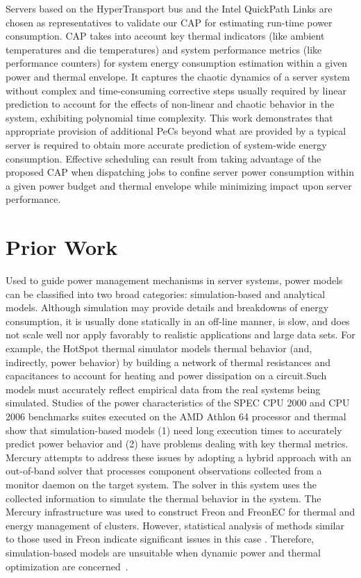 \documentclass[acmtaco]{acmtrans2m}
\begin{document}
Servers based on the HyperTransport bus \cite{HT2008} and the Intel
QuickPath Links \cite{Intel2009} are chosen as representatives to validate
our CAP for estimating run-time power consumption.  CAP takes into
account key thermal indicators (like ambient temperatures and die
temperatures) and system performance metrics (like performance counters)
for system energy consumption estimation within a given power and
thermal envelope. It captures the chaotic dynamics of a server system
without complex and time-consuming corrective steps usually required by
linear prediction to account for the effects of non-linear and chaotic
behavior in the system, exhibiting polynomial time complexity.  This
work demonstrates that appropriate provision of additional PeCs beyond
what are provided by a typical server is required to obtain more
accurate prediction of system-wide energy consumption.  Effective
scheduling can result from taking advantage of the proposed CAP when
dispatching jobs to confine server power consumption within a given
power budget and thermal envelope while minimizing impact upon server
performance.

\section{Prior Work}
\label{sec:priorwork}
Used to guide power management mechanisms in server systems, power
models can be classified into two broad categories: simulation-based and
analytical models. Although simulation may provide details and
breakdowns of energy consumption, it is usually done statically in an
off-line manner, is slow, and does not scale well nor apply favorably to
realistic applications and large data sets. For example, the HotSpot
thermal simulator \cite{Skadron2004} models thermal behavior (and,
indirectly, power behavior) by building a network of thermal resistances
and capacitances to account for heating and power dissipation on a
circuit.Such models must accurately reflect empirical data from the real
systems being simulated. Studies of the power characteristics of the
SPEC CPU 2000 and CPU 2006 benchmarks suites executed on the AMD Athlon
64 processor \cite{MesaMartinez2007} and thermal \cite{MesaMartinez2010}
show that simulation-based models (1) need long execution times to
accurately predict power behavior and (2) have problems dealing with key
thermal metrics.  Mercury \cite{Heath2006} attempts to address these
issues by adopting a hybrid approach with an out-of-band solver that
processes component observations collected from a monitor daemon on the
target system.  The solver in this system uses the collected information
to simulate the thermal behavior in the system.  The Mercury
infrastructure was used to construct Freon and FreonEC for thermal and
energy management of clusters. However, statistical analysis of methods
similar to those used in Freon indicate significant issues in this case
\cite{DavisRivoire2011}. Therefore, simulation-based models are unsuitable when dynamic
power and thermal optimization are concerned~\cite{Economou2006}.
 
\end{document}
